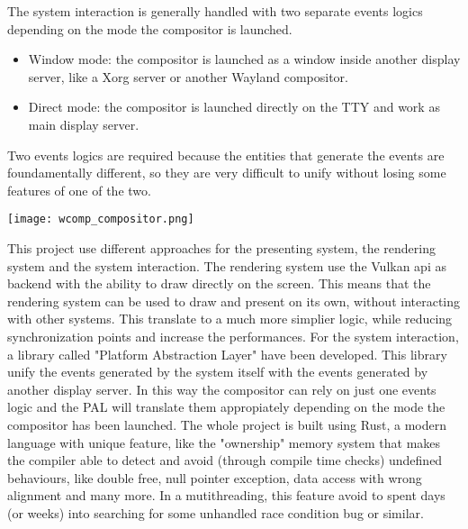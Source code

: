 The system interaction is generally handled with two separate events logics depending on the mode the compositor is launched.
\begin{itemize}
	\item Window mode: the compositor is launched as a window inside another display server, like a Xorg server or another Wayland compositor.
	\item Direct mode: the compositor is launched directly on the TTY and work as main display server.
\end{itemize}
Two events logics are required because the entities that generate the events are foundamentally different, so they are very difficult to unify without losing some features of one of the two.
\newpage
\begin{center}
	\texttt{[image: wcomp\_compositor.png]}
\end{center}

This project use different approaches for the presenting system, the rendering system and the system interaction.
The rendering system use the Vulkan api as backend with the ability to draw directly on the screen. This means that the rendering system can be used to draw and present on its own, without interacting with other systems. This translate to a much more simplier logic, while reducing synchronization points and increase the performances.\newline
For the system interaction, a library called "Platform Abstraction Layer" have been developed. This library unify the events generated by the system itself with the events generated by another display server. In this way the compositor can rely on just one events logic and the PAL will translate them appropiately depending on the mode the compositor has been launched.
The whole project is built using Rust, a modern language with unique feature, like the "ownership" memory system that makes the compiler able to detect and avoid (through compile time checks) undefined behaviours, like double free, null pointer exception, data access with wrong alignment and many more. In a mutithreading, this feature avoid to spent days (or weeks) into searching for some unhandled race condition bug or similar.